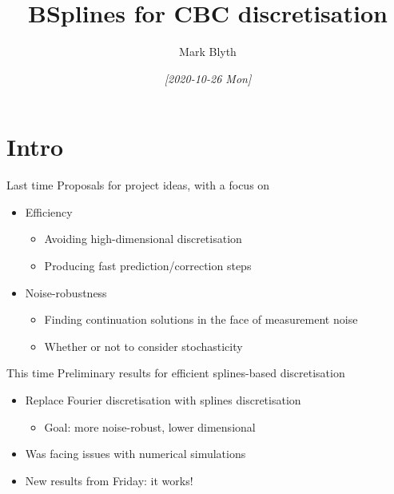 \documentclass[presentation]{beamer}
\author{Mark Blyth}
\date{\textit{[2020-10-26 Mon]}}
\title{BSplines for CBC discretisation}
\begin{document}
\maketitle

\section{Intro}
\label{sec:orgabc4901}
\begin{frame}[label={sec:org48e901b}]{Last time}
Proposals for project ideas, with a focus on
\vfill
\begin{itemize}
\item Efficiency
\begin{itemize}
\item Avoiding high-dimensional discretisation
\item Producing fast prediction/correction steps
\end{itemize}
\end{itemize}
\vfill
\begin{itemize}
\item Noise-robustness
\begin{itemize}
\item Finding continuation solutions in the face of measurement noise
\item Whether or not to consider stochasticity
\end{itemize}
\end{itemize}
\end{frame}

\begin{frame}[label={sec:org9f37fcc}]{This time}
Preliminary results for efficient splines-based discretisation
\vfill
\begin{itemize}
\item Replace Fourier discretisation with splines discretisation
\begin{itemize}
\item Goal: more noise-robust, lower dimensional
\end{itemize}
\end{itemize}
\vfill
\begin{itemize}
\item Was facing issues with numerical simulations
\end{itemize}
\vfill
\begin{itemize}
\item New results from Friday: it works!
\end{itemize}
\end{frame}
\end{document}

